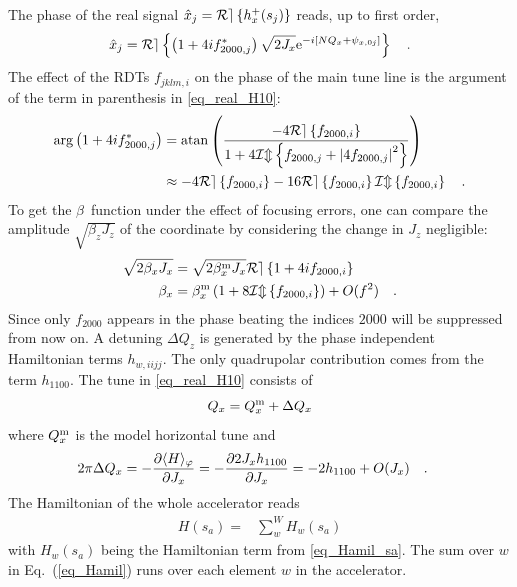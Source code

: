 The phase of the real signal $\hat{x}_j = \mathcal{Re} \left\{ h_x^+(s_j) \right\}$ reads,
up to first order,
%
\begin{equation}
    \hat{x}_j = \mathcal{Re} \left\{ \left( 1+4if_{2000,j}^* \right) \sqrt{2J_x}\text{e}^{-i[ N Q_x+\psi_{x,0j}]} \right\}
  \quad .
  \label{eq_real_H10}
\end{equation}
%
The effect of the RDTs $f_{jklm,i}$ on the phase of the main tune
line is the argument of the term in parenthesis in \eqref{eq_real_H10}:
%
\begin{align}
 \arg\left( 1+4if_{2000,j}^* \right)
  &=   \mathrm{atan} \left(
   \frac{
     -4\mathcal{Re} \left\{  f_{2000,i} \right\}
   }{
     1 +4\mathcal{Im} \left\{ f_{2000,j} + \left| 4 f_{2000,j}\right|^2  \right\}
   } \right) \notag \\
  &\approx  -4 \mathcal{Re} \left\{ f_{2000,i} \right\} - 16 \mathcal{Re} \left\{ f_{2000,i} \right\}\mathcal{Im} \left\{ f_{2000,i} \right\}
 \quad .
\label{eq_thetaH}
\end{align}
%
To get the $\beta$~function under the effect of focusing errors, one can compare the amplitude
$\sqrt{\beta_zJ_z}$ of the coordinate by considering the change in $J_z$ negligible:
%
\begin{align}
    \sqrt{2\beta_xJ_x} &= \sqrt{2\beta_x^\text{m} J_x}\mathcal{Re} \left\{  1 + 4if_{2000,i} \right\} \notag \\
    \beta_x &= \beta_x^\text{m} \left( 1 + 8\mathcal{Im} \left\{ f_{2000,i} \right\}\right) + O(f^2)
    \quad .
    \label{eq_betabeat}
\end{align}
%
Since only $f_{2000}$ appears in the phase beating the indices $2000$ will be suppressed from now on.
A detuning $\Delta Q_z$ is generated by the phase independent Hamiltonian terms $h_{w, iijj}$.
The only quadrupolar contribution comes from the term
$h_{1100}$.
The tune in \eqref{eq_real_H10} consists of
%
\begin{equation}
  \label{eq_tune_dshift}
  Q_x = Q_{x}^\text{m} + \Delta Q_x
\end{equation}
%
where $Q_{x}^\text{m}$ is the model horizontal tune and
%
\begin{align}
  2\pi\Delta Q_x &= -\frac{\partial \langle H \rangle_\varphi}{\partial J_x}
  = -\frac{\partial 2 J_x
    h_{1100}}{\partial J_x} = -2h_{1100} + O(J_x) 
    \quad . 
  \label{eq_tune_shift_h1100}
\end{align}
%
The Hamiltonian of the whole accelerator reads
%
\begin{align}
  H(s_a) =& \sum\limits_{w}^{W} H_w(s_a)
  \label{eq_Hamil}
\end{align}
%
with $H_w(s_a)$ being the Hamiltonian term from \eqref{eq_Hamil_sa}.
The sum over $w$ in Eq.~(\ref{eq_Hamil}) runs over each element $w$ in the accelerator.
